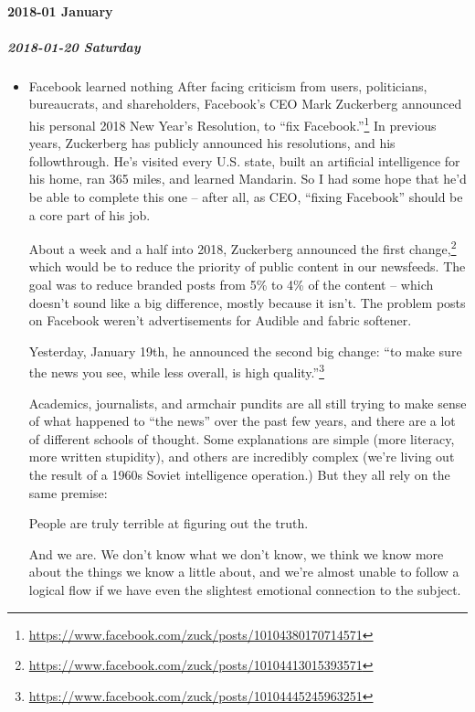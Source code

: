 \documentclass[11pt]{article}
\begin{document}
\paragraph*{2018-01 January}
\label{sec:org143dbfc}
\startcontents[level-4]
\subparagraph*{2018-01-20 Saturday}
\label{sec:org3e4edb9}
\begin{itemize}
\item Facebook learned nothing
\label{sec:org3345d3a}
After facing criticism from users, politicians, bureaucrats, and shareholders, Facebook’s CEO Mark Zuckerberg announced his personal 2018 New Year’s Resolution, to “fix Facebook.”\footnote{\url{https://www.facebook.com/zuck/posts/10104380170714571}} In previous years, Zuckerberg has publicly announced his resolutions, and his followthrough. He’s visited every U.S. state, built an artificial intelligence for his home, ran 365 miles, and learned Mandarin. So I had some hope that he’d be able to complete this one – after all, as CEO, “fixing Facebook” should be a core part of his job.

About a week and a half into 2018, Zuckerberg announced the first change,\footnote{\url{https://www.facebook.com/zuck/posts/10104413015393571}} which would be to reduce the priority of public content in our newsfeeds. The goal was to reduce branded posts from 5\% to 4\% of the content – which doesn’t sound like a big difference, mostly because it isn’t. The problem posts on Facebook weren’t advertisements for Audible and fabric softener.

Yesterday, January 19th, he announced the second big change: “to make sure the news you see, while less overall, is high quality.”\footnote{\url{https://www.facebook.com/zuck/posts/10104445245963251}}

Academics, journalists, and armchair pundits are all still trying to make sense of what happened to “the news” over the past few years, and there are a lot of different schools of thought. Some explanations are simple (more literacy, more written stupidity), and others are incredibly complex (we’re living out the result of a 1960s Soviet intelligence operation.) But they all rely on the same premise:

People are truly terrible at figuring out the truth.

And we are. We don’t know what we don’t know, we think we know more about the things we know a little about, and we’re almost unable to follow a logical flow if we have even the slightest emotional connection to the subject.


\end{itemize}
\end{document}
